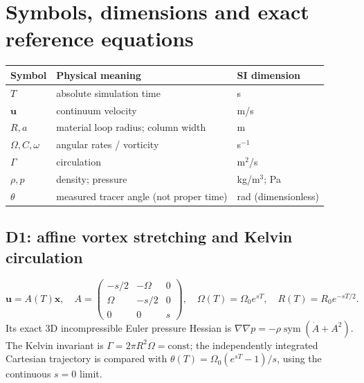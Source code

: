 \documentclass[10pt,a4paper]{article}
\begin{document}
\section{Symbols, dimensions and exact reference equations}
\begin{tabular}{lll}
\toprule
Symbol & Physical meaning & SI dimension\\\midrule
$T$ & absolute simulation time & s\\
$\mathbf u$ & continuum velocity & m/s\\
$R,a$ & material loop radius; column width & m\\
$\Omega,C,\omega$ & angular rates / vorticity & s$^{-1}$\\
$\Gamma$ & circulation & m$^2$/s\\
$\rho,p$ & density; pressure & kg/m$^3$; Pa\\
$\theta$ & measured tracer angle (not proper time) & rad (dimensionless)\\\bottomrule
\end{tabular}
\subsection{D1: affine vortex stretching and Kelvin circulation}
\begin{equation}
\mathbf u=A(T)\mathbf x,\quad
A=\begin{pmatrix}-s/2&-\Omega&0\\\Omega&-s/2&0\\0&0&s\end{pmatrix},\quad
\Omega(T)=\Omega_0 e^{sT},\quad R(T)=R_0e^{-sT/2}.
\end{equation}
Its exact 3D incompressible Euler pressure Hessian is
$\nabla\nabla p=-\rho\operatorname{sym}(\dot A+A^2)$. The Kelvin invariant is
$\Gamma=2\pi R^2\Omega=\mathrm{const}$; the independently integrated
Cartesian trajectory is compared with $\theta(T)=\Omega_0(e^{sT}-1)/s$,
using the continuous $s=0$ limit.
\end{document}
